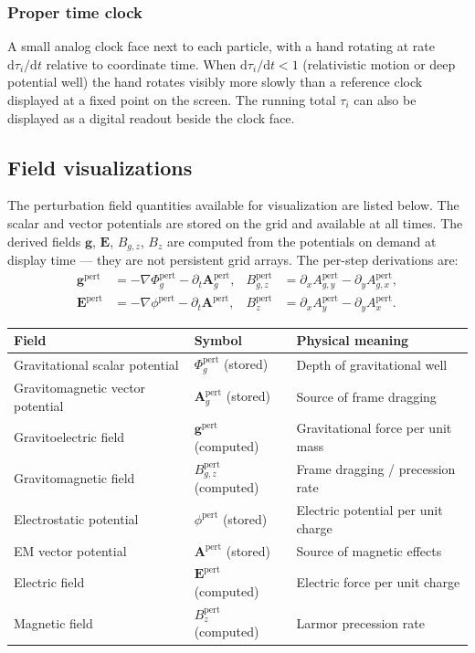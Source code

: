 \documentclass[11pt,a4paper]{article}
\newcommand{\vv}[1]{\mathbf{#1}}
\newcommand{\Phig}{\Phi_g}
\newcommand{\Ag}{\vv{A}_g}
\newcommand{\dd}{\mathrm{d}}
\begin{document}
\subsubsection*{Proper time clock}

A small analog clock face next to each particle, with a hand rotating at rate $\dd\tau_i/\dd t$ relative to coordinate time.  When $\dd\tau_i/\dd t < 1$ (relativistic motion or deep potential well) the hand rotates visibly more slowly than a reference clock displayed at a fixed point on the screen.  The running total $\tau_i$ can also be displayed as a digital readout beside the clock face.

\subsection{Field visualizations}

The perturbation field quantities available for visualization are listed below.  The scalar and vector potentials are stored on the grid and available at all times.  The derived fields $\vv{g}$, $\vv{E}$, $B_{g,z}$, $B_z$ are computed from the potentials on demand at display time --- they are not persistent grid arrays.  The per-step derivations are:
\begin{align}
  \vv{g}^{\mathrm{pert}}    &= -\nabla\Phig^{\mathrm{pert}} - \partial_t\Ag^{\mathrm{pert}}, &
  B_{g,z}^{\mathrm{pert}}   &= \partial_x A_{g,y}^{\mathrm{pert}} - \partial_y A_{g,x}^{\mathrm{pert}}, \\
  \vv{E}^{\mathrm{pert}}    &= -\nabla\phi^{\mathrm{pert}} - \partial_t\vv{A}^{\mathrm{pert}},  &
  B_z^{\mathrm{pert}}       &= \partial_x A_y^{\mathrm{pert}} - \partial_y A_x^{\mathrm{pert}}.
\end{align}

\begin{center}
\begin{tabular}{@{}L{4cm}L{4.5cm}L{4cm}@{}}
\toprule
\textbf{Field} & \textbf{Symbol} & \textbf{Physical meaning} \\
\midrule
Gravitational scalar potential & $\Phig^{\mathrm{pert}}$ (stored) & Depth of gravitational well \\
Gravitomagnetic vector potential & $\Ag^{\mathrm{pert}}$ (stored) & Source of frame dragging \\
Gravitoelectric field & $\vv{g}^{\mathrm{pert}}$ (computed) & Gravitational force per unit mass \\
Gravitomagnetic field & $B_{g,z}^{\mathrm{pert}}$ (computed) & Frame dragging / precession rate \\
Electrostatic potential & $\phi^{\mathrm{pert}}$ (stored) & Electric potential per unit charge \\
EM vector potential & $\vv{A}^{\mathrm{pert}}$ (stored) & Source of magnetic effects \\
Electric field & $\vv{E}^{\mathrm{pert}}$ (computed) & Electric force per unit charge \\
Magnetic field & $B_z^{\mathrm{pert}}$ (computed) & Larmor precession rate \\
\bottomrule
\end{tabular}
\end{center}
\end{document}

